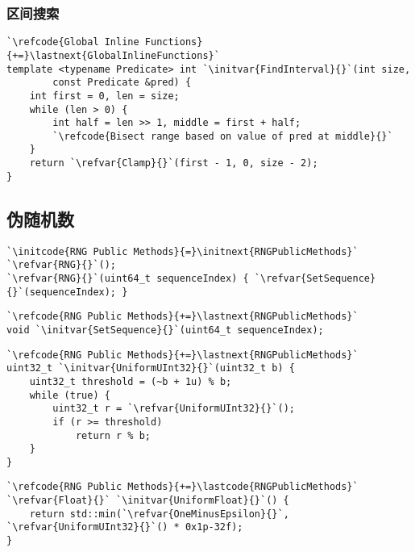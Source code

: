 \subsubsection*{区间搜索}
\begin{lstlisting}
`\refcode{Global Inline Functions}{+=}\lastnext{GlobalInlineFunctions}`
template <typename Predicate> int `\initvar{FindInterval}{}`(int size,
        const Predicate &pred) {
    int first = 0, len = size;
    while (len > 0) {
        int half = len >> 1, middle = first + half;
        `\refcode{Bisect range based on value of pred at middle}{}`
    }
    return `\refvar{Clamp}{}`(first - 1, 0, size - 2);
}
\end{lstlisting}

\subsection{伪随机数}\label{sub:伪随机数}
{}
\begin{lstlisting}
`\initcode{RNG Public Methods}{=}\initnext{RNGPublicMethods}`
`\refvar{RNG}{}`();
`\refvar{RNG}{}`(uint64_t sequenceIndex) { `\refvar{SetSequence}{}`(sequenceIndex); }
\end{lstlisting}

\begin{lstlisting}
`\refcode{RNG Public Methods}{+=}\lastnext{RNGPublicMethods}`
void `\initvar{SetSequence}{}`(uint64_t sequenceIndex);
\end{lstlisting}

\begin{lstlisting}
`\refcode{RNG Public Methods}{+=}\lastnext{RNGPublicMethods}`
uint32_t `\initvar{UniformUInt32}{}`(uint32_t b) {
    uint32_t threshold = (~b + 1u) % b;
    while (true) {
        uint32_t r = `\refvar{UniformUInt32}{}`();
        if (r >= threshold)
            return r % b;
    }
}
\end{lstlisting}

\begin{lstlisting}
`\refcode{RNG Public Methods}{+=}\lastcode{RNGPublicMethods}`
`\refvar{Float}{}` `\initvar{UniformFloat}{}`() {
    return std::min(`\refvar{OneMinusEpsilon}{}`, `\refvar{UniformUInt32}{}`() * 0x1p-32f);
}
\end{lstlisting}